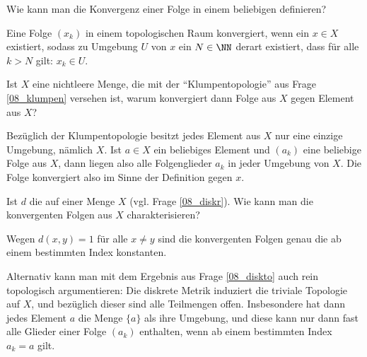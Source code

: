 \begin{frage}\heavy {}
  Wie kann man die Konvergenz einer Folge in einem beliebigen 
   definieren?
\end{frage}

\begin{antwort}
  Eine Folge $(x_k)$ in einem topologischen Raum konvergiert, wenn ein 
  $x\in X$ existiert, sodass zu  Umgebung $U$ von $x$ ein 
  $N\in \NN$ derart existiert, dass für alle $k>N$ gilt: $x_k \in U$. 
  \AntEnd
\end{antwort}

\begin{frage}
  Ist $X$ eine nichtleere Menge, die mit der "`Klumpentopologie"' 
  aus Frage \ref{08_klumpen} versehen ist, warum konvergiert dann  
  Folge aus $X$ gegen  Element aus $X$?
\end{frage}

\begin{antwort}
  Bezüglich der Klumpentopologie besitzt jedes Element aus $X$ nur 
  eine einzige Umgebung, nämlich $X$. Ist $a\in X$ ein beliebiges Element 
  und $(a_k)$ eine beliebige Folge aus $X$, dann liegen also alle 
  Folgenglieder $a_k$ in jeder Umgebung von $X$. 
  Die Folge konvergiert also im Sinne der Definition gegen $x$.
  \AntEnd 
\end{antwort} 

\begin{frage} 
  Ist $d$ die  auf einer Menge $X$ 
  (vgl. Frage \ref{08_diskr}). 
  Wie kann man die konvergenten Folgen aus $X$ charakterisieren?
\end{frage}

\begin{antwort}
  Wegen $d(x,y)=1$ für alle $x\not= y$ sind die konvergenten Folgen genau 
  die ab einem bestimmten Index konstanten. 

  Alternativ kann man mit dem Ergebnis aus Frage \ref{08_diskto} auch 
  rein topologisch argumentieren: 
  Die diskrete Metrik induziert die triviale Topologie auf $X$, 
  und bezüglich dieser sind alle Teilmengen offen. 
  Insbesondere hat dann jedes Element $a$ die Menge 
  $\{ a \}$ als ihre Umgebung, und diese kann nur dann 
  fast alle Glieder einer Folge $(a_k)$ enthalten, wenn ab einem 
  bestimmten Index $a_k = a$ gilt.\AntEnd
\end{antwort}

